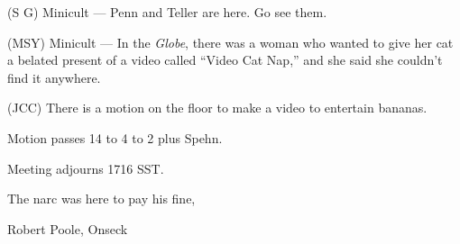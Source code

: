(S G) Minicult --- Penn and Teller are here.  Go see them.

(MSY) Minicult --- In the {\em Globe\/}, there was a woman who wanted to give
her cat a belated present of a video called ``Video Cat Nap,'' and she said
she couldn't find it anywhere.

(JCC) There is a motion on the floor to make a video to entertain bananas.

Motion passes 14 to 4 to 2 plus Spehn.

Meeting adjourns 1716 SST.

\vspace{0.15in}
\begin{center}
The narc was here to pay his fine,

Robert Poole, Onseck
\end{center}

